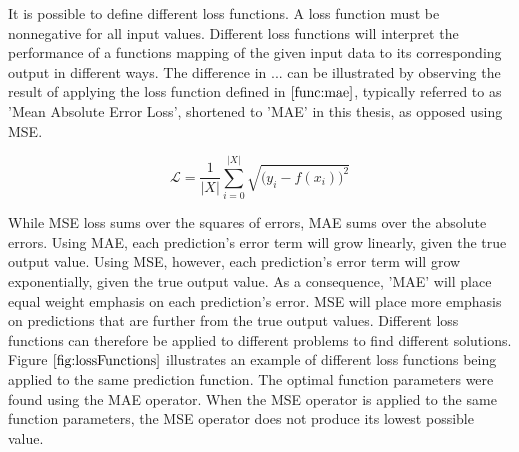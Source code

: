 It is possible to define different loss functions. A loss function must be nonnegative for all input values.
Different loss functions will interpret the performance of a functions mapping of the given input data to its corresponding output in different ways.
The difference in ... can be illustrated by observing the result of applying the loss function defined in $ \eqref{func:mae} $, typically referred to as 'Mean Absolute Error Loss', shortened to 'MAE' in this thesis, as opposed using MSE.

\[ 
    \mathcal{L} = \frac{1}{|X|}\sum_{i = 0}^{|X|} \sqrt{\big(y_i - f(x_i)\big)^2} \tag{2.4} \label{func:mae} 
\]

While MSE loss sums over the squares of errors, MAE sums over the absolute errors.
Using MAE, each prediction's error term will grow linearly, given the true output value.
Using MSE, however, each prediction's error term will grow exponentially, given the true output value.
As a consequence, 'MAE' will place equal weight emphasis on each prediction's error.
MSE will place more emphasis on predictions that are further from the true output values.
Different loss functions can therefore be applied to different problems to find different solutions. 
Figure $ \eqref{fig:lossFunctions} $ illustrates an example of different loss functions being applied to the same prediction function.
The optimal function parameters were found using the MAE operator. When the MSE operator is applied to the same function parameters,
the MSE operator does not produce its lowest possible value.

